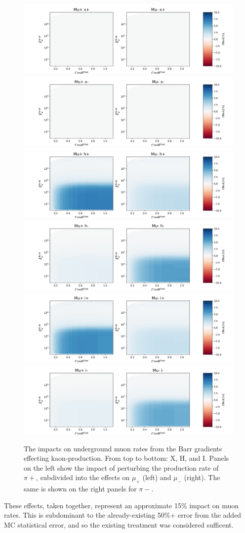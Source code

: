 \documentclass[main.tex]{subfiles}
\begin{document}
\begin{figure}
    \centering
    \includegraphics[width=0.45\linewidth]{./figures/muon/under_muon_barr_x+.png}%
    \includegraphics[width=0.45\linewidth]{./figures/muon/under_muon_barr_x-.png}
    \includegraphics[width=0.45\linewidth]{./figures/muon/under_muon_barr_h+.png}%
    \includegraphics[width=0.45\linewidth]{./figures/muon/under_muon_barr_h-.png}
    \includegraphics[width=0.45\linewidth]{./figures/muon/under_muon_barr_i+.png}%
    \includegraphics[width=0.45\linewidth]{./figures/muon/under_muon_barr_i-.png}
    \caption{The impacts on underground muon rates from the Barr gradients effecting kaon-production. From top to bottom: X, H, and I. Panels on the left show the impact of perturbing the production rate of $\pi+$, subdivided into the effects on $\mu_{+}$ (left) and $\mu_{-}$ (right). The same is shown on the right panels for $\pi-$.}\label{fig:under_barr_muon_pion}
\end{figure}

These effects, taken together, represent an approximate 15\% impact on muon rates. 
This is subdominant to the already-existing 50\%+ error from the added MC statistical error, and so the existing treatment was considered sufficent. 
\end{document}
